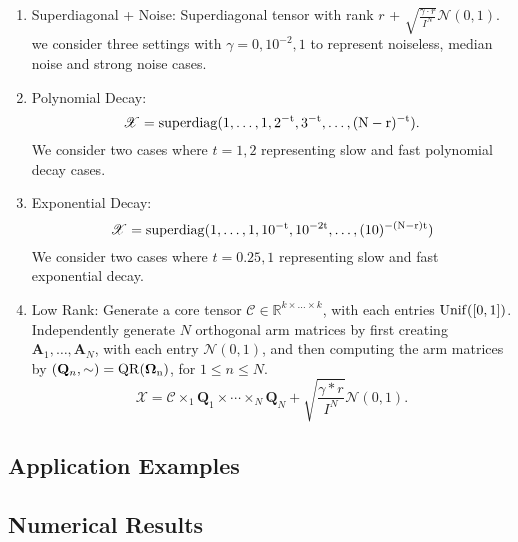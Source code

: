 \begin{enumerate}
    \item Superdiagonal + Noise: Superdiagonal tensor with rank $r$ + $\sqrt{\frac{\gamma \cdot r}{I^N}} \mathcal{N}(0,1)$. we consider three settings with $\gamma = 0, 10^{-2}, 1$ to represent noiseless, median noise and strong noise cases. 
    \item Polynomial Decay: 
    \begin{equation}
        \mathscr{X} = \rm{superdiag}(1,\dots,1, 2^{-t},3^{-t},\dots, (N-r)^{-t}).
    \end{equation}
    We consider two cases where $t = 1,2$ representing slow and fast polynomial decay cases. 
    \item Exponential Decay: 
    \begin{equation}
        \mathscr{X} =  \rm{superdiag}(1,\dots,1, 10^{-t},10^{-2t},\dots, (10)^{-(N-r)t}) 
    \end{equation}
    We consider two cases where $t = 0.25,1$ representing slow and fast exponential decay. 
    \item Low Rank: Generate a core tensor $\mathscr{C} \in \mathbb{R}^{k \times \dots \times k}$, with each entries $\rm{Unif}([0,1])$. Independently generate $N$ orthogonal arm matrices by first creating $\mathbf{A}_1, \dots, \mathbf{A}_N$, with each entry $\mathcal{N}(0,1)$, and then computing the arm matrices by $(\mathbf{Q}_n, \sim) = \rm{QR}(\mathbf{\Omega}_n)$, for $1 \leq n \leq N$.  
    \begin{equation}
        \mathscr{X} = \mathscr{C} \times_1 \mathbf{Q}_1 \times \cdots \times_N \mathbf{Q}_N + \sqrt{\frac{\gamma*r}{I^N}} \mathcal{N}(0,1).
    \end{equation}
\end{enumerate}

\subsection{Application Examples}

\subsection{Numerical Results}

